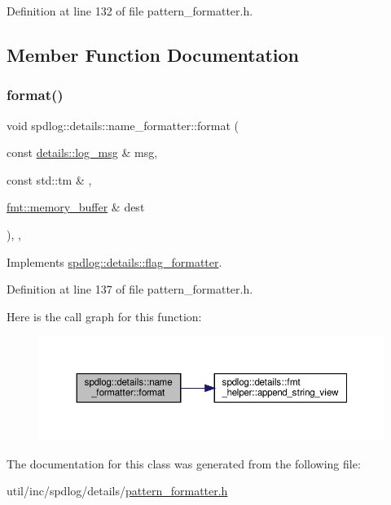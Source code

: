 Definition at line 132 of file pattern\+\_\+formatter.\+h.



\subsection{Member Function Documentation}
\mbox{\label{classspdlog_1_1details_1_1name__formatter_ac7e2adb4e29b3fbf06ef3c0e236d64de}} 
\subsubsection{\texorpdfstring{format()}{format()}}
{\footnotesize\ttfamily void spdlog\+::details\+::name\+\_\+formatter\+::format (\begin{DoxyParamCaption}\item[{const \hyperlink{structspdlog_1_1details_1_1log__msg}{details\+::log\+\_\+msg} \&}]{msg,  }\item[{const std\+::tm \&}]{,  }\item[{\hyperlink{format_8h_a21cbf729f69302f578e6db21c5e9e0d2}{fmt\+::memory\+\_\+buffer} \&}]{dest }\end{DoxyParamCaption})\hspace{0.3cm}{\ttfamily [inline]}, {\ttfamily [override]}, {\ttfamily [virtual]}}



Implements \hyperlink{classspdlog_1_1details_1_1flag__formatter_a33fb3e42a4c8200cceb833d92b53fb67}{spdlog\+::details\+::flag\+\_\+formatter}.



Definition at line 137 of file pattern\+\_\+formatter.\+h.

Here is the call graph for this function\+:
\nopagebreak
\begin{figure}[H]
\begin{center}
\leavevmode
\includegraphics[width=350pt]{classspdlog_1_1details_1_1name__formatter_ac7e2adb4e29b3fbf06ef3c0e236d64de_cgraph}
\end{center}
\end{figure}


The documentation for this class was generated from the following file\+:\begin{DoxyCompactItemize}
\item 
util/inc/spdlog/details/\hyperlink{pattern__formatter_8h}{pattern\+\_\+formatter.\+h}\end{DoxyCompactItemize}

